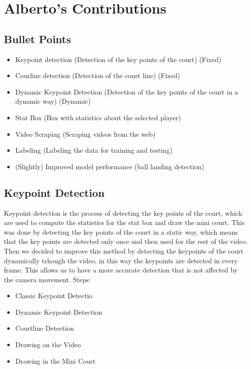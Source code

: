 
\section{Alberto's Contributions}

\subsection{Bullet Points}

\begin{itemize}
    \item Keypoint detection (Detection of the key points of the court) (Fixed)
    \item Courline detection (Detection of the court line) (Fixed)
    \item Dynamic Keypoint Detection (Detection of the key points of the court in a dynamic way) (Dynamic)
    \item Stat Box (Box with statistics about the selected player)
    \item Video Scraping (Scraping videos from the web)
    \item Labeling (Labeling the data for training and testing)
    \item (Slightly) Improved model performance (ball landing detection)
\end{itemize}

\subsection{Keypoint Detection}
Keypoint detection is the process of detecting the key points of the court, which are used to compute the statistics for the stat box and draw the mini court.
This was done by detecting the key points of the court in a static way, which means that the key points are detected only once and then used for the rest of the video.
Then we decided to improve this method by detecting the keypoints of the court dynamically trhough the video, in this way the keypoints are detected in every frame.
This allows us to have a more accurate detection that is not affected by the camera movement.
Steps:
\begin{itemize}
    \item Classic Keypoint Detectio
    \item Dynamic Keypoint Detection
    \item Courtline Detection
    \item Drawing on the Video
    \item Drawing in the Mini Court
\end{itemize}

